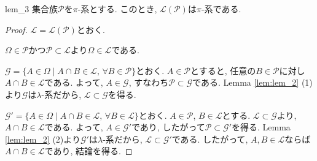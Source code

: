 \begin{lemma}{}{lem_3}
    集合族$\mathcal{P}$を$\pi$-系とする.
    このとき, $\mathcal{L}(\mathcal{P})$は$\pi$-系である.
\end{lemma}
\begin{proof}
    $\mathcal{L}=\mathcal{L}(\mathcal{P})$とおく.

    $\Omega\in\mathcal{P}$かつ$\mathcal{P}\subset \mathcal{L}$より$\Omega\in\mathcal{L}$である.

    $\mathcal{G}=\{A\in\Omega\mid A\cap B\in\mathcal{L},\,\forall B\in\mathcal{P}\}$とおく.
    $A\in\mathcal{P}$とすると, 任意の$B\in\mathcal{P}$に対し$A\cap B\in\mathcal{L}$である.
    よって, $A\in\mathcal{G}$, すなわち$\mathcal{P}\subset\mathcal{G}$である.
    Lemma \ref{lem:lem_2} (1)より$\mathcal{G}$は$\lambda$-系だから, $\mathcal{L}\subset \mathcal{G}$を得る.

    $\mathcal{G}'=\{A\in\Omega\mid A\cap B\in\mathcal{L},\,\forall B\in\mathcal{L}\}$とおく.
    $A\in\mathcal{P}$, $B\in\mathcal{L}$とする.
    $\mathcal{L}\subset\mathcal{G}$より, $A\cap B\in\mathcal{L}$である.
    よって, $A\in\mathcal{G}'$であり, したがって$\mathcal{P}\subset\mathcal{G}'$を得る.
    Lemma \ref{lem:lem_2} (2)より$\mathcal{G}'$は$\lambda$-系だから, $\mathcal{L}\subset\mathcal{G}'$である.
    したがって, $A,B\in\mathcal{L}$ならば$A\cap B\in\mathcal{L}$であり, 結論を得る.
\end{proof}

